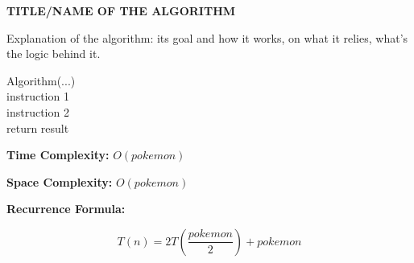 \documentclass[a4paper,12pt]{article}
\begin{document}
\begin{tcolorbox}[
    colback=gray!30,
    colframe=black,
    boxrule=1pt,
    arc=0mm
]

\begin{tcolorbox}[
    colback=gray!10,
    colframe=black,
    arc=0mm
]
\centering
{\Huge\bfseries TITLE/NAME OF THE ALGORITHM}
\end{tcolorbox}

\begin{tcolorbox}[
    colback=gray!10,
    colframe=black,
    arc=0mm
]
\small
Explanation of the algorithm: its goal and how it works, on what it relies, what's the logic behind it.
\end{tcolorbox}

\begin{tcolorbox}[
    colback=black!5,
    colframe=black,
    arc=0mm,
    title=Pseudo-code
]
\small
\ttfamily
Algorithm(...)\\
\quad instruction 1\\
\quad instruction 2\\
\quad return result
\end{tcolorbox}

\begin{tcolorbox}[
    colback=cyan!20,
    colframe=black,
    arc=0mm
]
\small
\textbf{Time Complexity:} $O(pokemon)$
\end{tcolorbox}

\begin{tcolorbox}[
    colback=violet!20,
    colframe=black,
    arc=0mm
]
\small
\textbf{Space Complexity:} $O(pokemon)$
\end{tcolorbox}

\begin{tcolorbox}[
    colback=pink!20,
    colframe=black,
    arc=0mm
]
\small
\textbf{Recurrence Formula:}

\[
T(n)=2T\left(\frac{pokemon}{2}\right)+pokemon
\]
\end{tcolorbox}

\end{tcolorbox}
\end{document}
